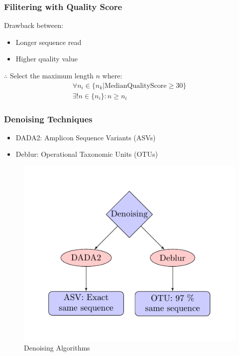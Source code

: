 \documentclass{beamer}
\begin{document}
    \begin{frame}[allowframebreaks]
        \frametitle{Filitering with Quality Score}

        Drawback between:
        \begin{itemize}
            \item Longer sequence read
            \item Higher quality value
        \end{itemize}

        $\therefore$ Select the maximum length $n$ where:
        \begin{equation}
            \begin{array}{c}
                \forall n_i \in \{ n_k | \mbox{MedianQualityScore} \geq 30 \} \\
                \exists ! n \in \{n_i\} : n \geq n_i
            \end{array}
        \end{equation}
    \end{frame}

    \begin{frame}
        \frametitle{Denoising Techniques}

        \begin{itemize}
            \item DADA2: Amplicon Sequence Variants (ASVs) \cite{DADA2}
            \item Deblur: Operational Taxonomic Units (OTUs) \cite{Deblur1}
        \end{itemize}

        \begin{figure}
            \includegraphics[width=0.4 \linewidth]{figures/tikz/denoising.pdf}
            \caption{Denoising Algorithms}
        \end{figure}
    \end{frame}
\end{document}
